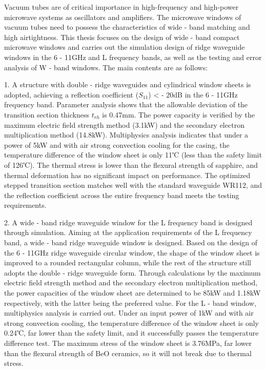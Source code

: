 \documentclass[master]{thesis-uestc}
\begin{document}
\begin{englishabstract}
    Vacuum tubes are of critical importance in high-frequency and high-power microwave systems as oscillators and amplifiers. The microwave windows of vacuum tubes need to possess the characteristics of wide - band matching and high airtightness. This thesis focuses on the design of wide - band compact microwave windows and carries out the simulation design of ridge waveguide windows in the 6 - 11GHz and L frequency bands, as well as the testing and error analysis of W - band windows. The main contents are as follows:

1. A structure with double - ridge waveguides and cylindrical window sheets is adopted, achieving a reflection coefficient (\(S_{11}\)) < - 20dB in the 6 - 11GHz frequency band. Parameter analysis shows that the allowable deviation of the transition section thickness \(t_{rh}\) is 0.47mm. The power capacity is verified by the maximum electric field strength method (3.1kW) and the secondary electron multiplication method (14.8kW). Multiphysics analysis indicates that under a power of 5kW and with air strong convection cooling for the casing, the temperature difference of the window sheet is only 11℃ (less than the safety limit of 126℃). The thermal stress is lower than the flexural strength of sapphire, and thermal deformation has no significant impact on performance. The optimized stepped transition section matches well with the standard waveguide WR112, and the reflection coefficient across the entire frequency band meets the testing requirements.

2. A wide - band ridge waveguide window for the L frequency band is designed through simulation. Aiming at the application requirements of the L frequency band, a wide - band ridge waveguide window is designed. Based on the design of the 6 - 11GHz ridge waveguide circular window, the shape of the window sheet is improved to a rounded rectangular column, while the rest of the structure still adopts the double - ridge waveguide form. Through calculations by the maximum electric field strength method and the secondary electron multiplication method, the power capacities of the window sheet are determined to be 85kW and 1.18kW respectively, with the latter being the preferred value.
For the L - band window, multiphysics analysis is carried out. Under an input power of 1kW and with air strong convection cooling, the temperature difference of the window sheet is only 0.24℃, far lower than the safety limit, and it successfully passes the temperature difference test. The maximum stress of the window sheet is 3.76MPa, far lower than the flexural strength of BeO ceramics, so it will not break due to thermal stress.


\end{englishabstract}
\end{document}
